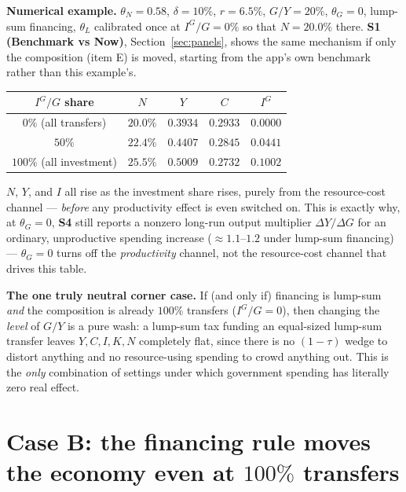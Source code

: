 \documentclass[11pt]{article}
\begin{document}
\begin{casebox}
\textbf{Numerical example.} $\theta_N=0.58$, $\delta=10\%$, $r=6.5\%$,
$G/Y=20\%$, $\theta_G=0$, lump-sum financing, $\theta_L$ calibrated once at
$I^G/G=0\%$ so that $N=20.0\%$ there. \textbf{S1 (Benchmark vs Now)}, Section~\ref{sec:panels}, shows the
same mechanism if only the composition (item E) is moved, starting from the
app's own benchmark rather than this example's.

\begin{center}
\begin{tabular}{ccccc}
\toprule
$I^G/G$ share & $N$ & $Y$ & $C$ & $I^G$ \\
\midrule
$0\%$ (all transfers)   & $20.0\%$ & $0.3934$ & $0.2933$ & $0.0000$ \\
$50\%$                  & $22.4\%$ & $0.4407$ & $0.2845$ & $0.0441$ \\
$100\%$ (all investment) & $25.5\%$ & $0.5009$ & $0.2732$ & $0.1002$ \\
\bottomrule
\end{tabular}
\end{center}
\end{casebox}

$N$, $Y$, and $I$ all rise as the investment share rises, purely from the
resource-cost channel --- \emph{before} any productivity effect is even
switched on. This is exactly why, at $\theta_G=0$, \textbf{S4} still
reports a nonzero long-run output multiplier $\Delta Y/\Delta G$ for an ordinary,
unproductive spending increase ($\approx 1.1$--$1.2$ under lump-sum
financing) --- $\theta_G=0$ turns off the \emph{productivity} channel, not
the resource-cost channel that drives this table.

\begin{notebox}
\textbf{The one truly neutral corner case.} If (and only if) financing is
lump-sum \emph{and} the composition is already $100\%$ transfers
($I^G/G=0$), then changing the \emph{level} of $G/Y$ is a pure wash: a
lump-sum tax funding an equal-sized lump-sum transfer leaves $Y,C,I,K,N$
completely flat, since there is no $(1-\tau)$ wedge to distort anything and
no resource-using spending to crowd anything out. This is the \emph{only}
combination of settings under which government spending has literally zero
real effect.
\end{notebox}

\section{Case B: the financing rule moves the economy even at $100\%$ transfers}
\label{sec:caseB}
\end{document}
